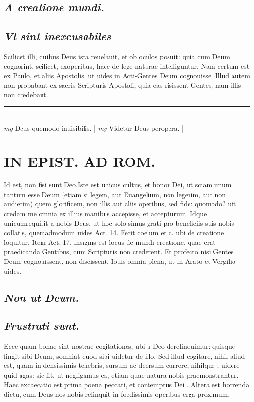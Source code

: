 \documentclass{article}
\begin{document}
\begin{pages}
\subsection*{\textit{A creatione mundi. }}
{}
\subsection*{\textit{Vt sint inexcusabiles }}\pstart Scilicet illi, quibus Deus ista reuelauit, et ob oculos posuit: quia cum Deum cognorint, scilicet, exoperibus, haec de lege naturae intelliguntur. Nam certum est ex Paulo, et aliis Apostolis, ut uides in Acti-Gentes Deum cognouisse. Illud autem non probabant ex sacris Scripturis Apostoli, quia eas risissent Gentes, nam illis non credebant.   \pend
\vspace{0.5cm}\noindent
\vspace{0.2cm}\rule{1cm}{0.2pt}\\ 
\hspace{0.2cm}\textit{mg}
\footnotesize Deus quomodo inuisibilis.  
\normalsize| 
\hspace{0.2cm}\textit{mg}
\footnotesize Videtur Deus peropera.  
\normalsize| 
\section*{IN EPIST. AD ROM.  }
\marginpar{[ p.2 ]}\pstart Id est, non fisi sunt Deo.Iste est unicus cultus, et honor Dei, ut sciam unum tantum esse Deum (etiam si legem, aut Euangelium, non legerim, aut non audierim) quem glorificem, non illis aut aliis operibus, sed fide: quomodo? uit credam me omnia ex illius manibus accepisse, et accepturum. Idque unicumrequirit a nobis Deus, ut hoc solo simus grati pro beneficiis suis nobis collatis, quemadmodum uides Act. 14.  Fecit coelum et c. ubi de creatione loquitur. Item Act. 17.  insignis est locus de mundi creatione, quae erat praedicanda Gentibus, cum Scripturis non crederent.  Et profecto nisi Gentes Deum cognouissent, non discissent, Iouis omnia plena, ut in Arato et Vergilio uides.  \pend
{}
{}
\subsection*{\textit{Non ut Deum. }}
{}
\subsection*{\textit{Frustrati sunt. }}\pstart Ecce quam bonae sint nostrae cogitationes, ubi a Deo derelinquimur: quisque fingit sibi Deum, somniat quod sibi uidetur de illo. Sed illud cogitare, nihil aliud est, quam in densissimis tenebris, sursum ac deorsum currere, nihilque ; uidere quid agas: sic fit, ut negligamus ea, etiam quae natura nobis praemonstrantur. Haec excaecatio est prima poena peccati, et contemptus Dei . Altera est horrenda dictu, cum Deus nos nobis relinquit in foedissimis operibus erga proximum.   \pend
{}
{}

\end{pages}
\end{document}
